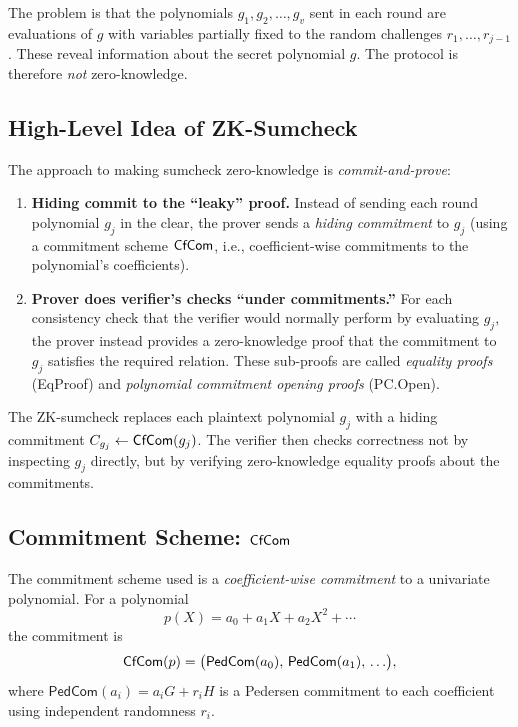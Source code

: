 \documentclass[11pt]{article}
\begin{document}
\medskip
The problem is that the polynomials $g_1, g_2, \ldots, g_v$ sent in
each round are evaluations of $g$ with variables partially fixed to
the random challenges $r_1, \ldots, r_{j-1}$.  These reveal
information about the secret polynomial $g$.  The protocol is
therefore \emph{not} zero-knowledge.

\subsection{High-Level Idea of ZK-Sumcheck}

The approach to making sumcheck zero-knowledge is \emph{commit-and-prove}:

\begin{enumerate}
  \item \textbf{Hiding commit to the ``leaky'' proof.}
    Instead of sending each round polynomial $g_j$ in the clear, the
    prover sends a \emph{hiding commitment} to $g_j$ (using a
    commitment scheme $\mathsf{CfCom}$, i.e., coefficient-wise commitments to the
    polynomial's coefficients).

  \item \textbf{Prover does verifier's checks ``under commitments.''}
    For each consistency check that the verifier would normally perform
    by evaluating $g_j$, the prover instead provides a zero-knowledge
    proof that the commitment to $g_j$ satisfies the required relation.
    These sub-proofs are called \emph{equality proofs} (EqProof) and
    \emph{polynomial commitment opening proofs} (PC.Open).
\end{enumerate}

\begin{highlight}[title={Key Idea}]
The ZK-sumcheck replaces each plaintext polynomial $g_j$ with a
hiding commitment $C_{g_j} \leftarrow \mathsf{CfCom}(g_j)$.  The verifier
then checks correctness not by inspecting $g_j$ directly, but by
verifying zero-knowledge equality proofs about the commitments.
\end{highlight}

\subsection{Commitment Scheme: \texorpdfstring{$\mathsf{CfCom}$}{CfCom}}

The commitment scheme used is a \emph{coefficient-wise commitment} to
a univariate polynomial.  For a polynomial
\[
  p(X) = a_0 + a_1 X + a_2 X^2 + \cdots
\]
the commitment is
\[
  \mathsf{CfCom}(p) = \bigl(\mathsf{PedCom}(a_0),\, \mathsf{PedCom}(a_1),\, \ldots\bigr),
\]
where $\mathsf{PedCom}(a_i) = a_i G + r_i H$ is a Pedersen commitment
to each coefficient using independent randomness $r_i$.
\end{document}

